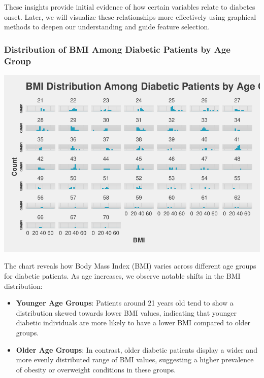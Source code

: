 \documentclass[
]{article}
\providecommand{\tightlist}{%
  \setlength{\itemsep}{0pt}\setlength{\parskip}{0pt}}
\begin{document}
These insights provide initial evidence of how certain variables relate
to diabetes onset. Later, we will visualize these relationships more
effectively using graphical methods to deepen our understanding and
guide feature selection.

\subsubsection{Distribution of BMI Among Diabetic Patients by Age
Group}\label{distribution-of-bmi-among-diabetic-patients-by-age-group}

\begin{center}\includegraphics{Diabetes-Project_files/figure-latex/BMI vs Age-1} \end{center}

The chart reveals how Body Mass Index (BMI) varies across different age
groups for diabetic patients. As age increases, we observe notable
shifts in the BMI distribution:

\begin{itemize}
\tightlist
\item
  \textbf{Younger Age Groups}: Patients around 21 years old tend to show
  a distribution skewed towards lower BMI values, indicating that
  younger diabetic individuals are more likely to have a lower BMI
  compared to older groups.\\
\item
  \textbf{Older Age Groups}: In contrast, older diabetic patients
  display a wider and more evenly distributed range of BMI values,
  suggesting a higher prevalence of obesity or overweight conditions in
  these groups.
\end{itemize}
\end{document}
